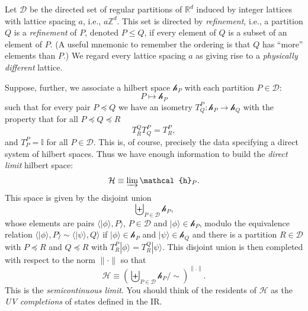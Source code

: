 \documentclass[twocolumn,lengthcheck,superscriptaddress]{revtex4-1}
\theoremstyle{definition}
\theoremstyle{remark}
\begin{document}
Let $\mathcal{D}$ be the directed set of regular partitions of $\mathbb{R}^d$ induced by integer lattices with lattice spacing $a$, i.e., $a\mathbb{Z}^d$. This set is directed by \emph{refinement}, i.e., a partition $Q$ is a \emph{refinement} of $P$, denoted $P\le Q$, if every element of $Q$ is a subset of an element of $P$. (A useful mnemonic to remember the ordering is that $Q$ has ``more'' elements than $P$.) We regard every lattice spacing $a$ as giving rise to a \emph{physically different} lattice.
 
Suppose, further, we associate a hilbert space $\mathcal{h}_P$ with each partition $P\in\mathcal{D}$:
\begin{equation}
	P \mapsto \mathcal{h}_P
\end{equation}
such that for every pair $P\preceq Q$ we have an isometry $T_{Q}^P:\mathcal{h}_P\rightarrow \mathcal{h}_Q$ with the property that for all $P\preceq Q\preceq R$
\begin{equation}
	T_{R}^QT_{Q}^P=T_{R}^P,
\end{equation}
and $T^{P}_P = \mathbb{I}$ for all $P\in\mathcal{D}$. This is, of course, precisely the data specifying a direct system of hilbert spaces. Thus we have enough information to build the \emph{direct limit} hilbert space:
\begin{equation}
	\mathcal{H} \equiv \varinjlim \mathcal{h}_P.
\end{equation}
This space is given by the disjoint union 
\begin{equation}
	\biguplus_{P\in\mathcal{D}}\mathcal{h}_P,
\end{equation}
whose elements are pairs $\langle |\phi\rangle, P\rangle$, $P\in\mathcal{D}$ and $|\phi\rangle\in \mathcal{h}_P$, 
modulo the equivalence relation $\langle |\phi\rangle, P\rangle \sim \langle |\psi\rangle, Q\rangle$ if $|\phi\rangle \in \mathcal{h}_P$ and $|\psi\rangle \in \mathcal{h}_Q$ and there is a partition $R\in\mathcal{D}$ with $P\preceq R$ and $Q\preceq R$ with $T_{R}^P|\phi\rangle = T_{R}^Q|\psi\rangle$. This disjoint union is then completed with respect to the norm $\|\cdot\|$ so that
\begin{equation}
	 \mathcal{H} \equiv \left(\biguplus_{P\in\mathcal{D}}\mathcal{h}_P\bigg/\sim\right)^{\|.\|}.
\end{equation} 
This is the \emph{semicontinuous limit}. You should think of the residents of $\mathcal{H}$ as the \emph{UV completions} of states defined in the IR.  
\end{document}
